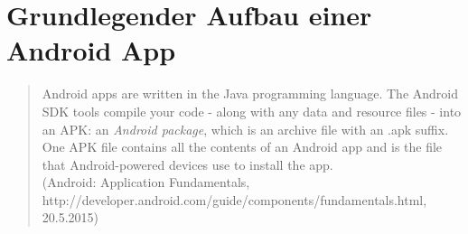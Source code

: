 	\section{Grundlegender Aufbau einer Android App}
	\begin{quote}
	Android apps are written in the Java programming language. The Android SDK tools compile your code - along with any data and resource files - into an APK: an \textit{Android package}, which is an archive file with an .apk suffix. One APK file contains all the contents of an Android app and is the file that Android-powered devices use to install the app.\\
	(Android: Application Fundamentals,\\ http://developer.android.com/guide/components/fundamentals.html,\\ 20.5.2015)
	\end{quote}
	
